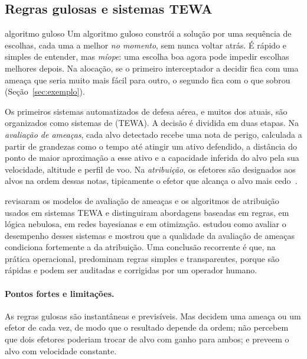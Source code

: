 \subsection{Regras gulosas e sistemas TEWA}

\begin{conceitobox}{algoritmo guloso}
Um algoritmo guloso constrói a solução por uma sequência de escolhas, cada uma a melhor \emph{no momento}, sem nunca
voltar atrás. É rápido e simples de entender, mas \emph{míope}: uma escolha boa agora pode impedir escolhas melhores
depois. Na alocação, se o primeiro interceptador a decidir fica com uma ameaça que seria muito mais fácil para outro, o
segundo fica com o que sobrou (Seção~\ref{sec:exemplo}).
\end{conceitobox}

Os primeiros sistemas automatizados de defesa aérea, e muitos dos atuais, são organizados como sistemas de
 (TEWA). A decisão é dividida em duas etapas. Na
\emph{avaliação de ameaças}, cada alvo detectado recebe uma nota de perigo, calculada a partir de grandezas como o tempo até
atingir um ativo defendido, a distância do ponto de maior aproximação a esse ativo e a capacidade inferida do alvo pela
sua velocidade, altitude e perfil de voo. Na \emph{atribuição}, os efetores são designados aos alvos na ordem dessas
notas, tipicamente o efetor que alcança o alvo mais cedo~\cite{roux2007}.

\citet{roux2007} revisaram os modelos de avaliação de ameaças e os algoritmos de atribuição usados em sistemas TEWA e
distinguiram abordagens baseadas em regras, em lógica nebulosa, em redes bayesianas e em otimização. \citet{johansson2010}
estudou como avaliar o desempenho desses sistemas e mostrou que a qualidade da avaliação de ameaças condiciona fortemente a
da atribuição. Uma conclusão recorrente é que, na prática operacional, predominam regras simples e transparentes, porque são
rápidas e podem ser auditadas e corrigidas por um operador humano.

\paragraph{Pontos fortes e limitações.} As regras gulosas são instantâneas e previsíveis. Mas decidem uma ameaça ou um
efetor de cada vez, de modo que o resultado depende da ordem; não percebem que dois efetores poderiam trocar de alvo com
ganho para ambos; e preveem o alvo com velocidade constante.

